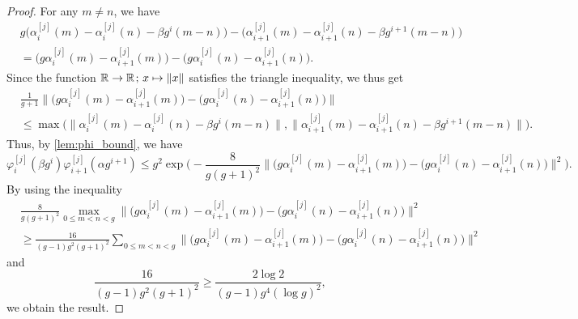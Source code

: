 \documentclass[hidelinks]{amsart}
\numberwithin{equation}{section}
\theoremstyle{plain}
\theoremstyle{definition}
\let\tmp\phi
\let\phi\varphi
\let\varphi\tmp
\let\tmp\epsilon
\let\epsilon\varepsilon
\let\varepsilon\tmp
\newcommand{\semicolon}{\nobreak\mskip2mu\mathpunct{}\nonscript
\mkern-\thinmuskip{;}\mskip6muplus1mu\relax}
\begin{document}
\begin{proof}
For any $m\neq n$, we have
\begin{align}
&g\bigl(\alpha_{i}^{[j]}(m)-\alpha_{i}^{[j]}(n)-\beta g^{i}(m-n)\bigr)
-
\bigl(\alpha_{i+1}^{[j]}(m)-\alpha_{i+1}^{[j]}(n)-\beta g^{i+1}(m-n)\bigr)\\
&=
\bigl(g\alpha_{i}^{[j]}(m)-\alpha_{i+1}^{[j]}(m)\bigr)
-
\bigl(g\alpha_{i}^{[j]}(n)-\alpha_{i+1}^{[j]}(n)\bigr).
\end{align}
Since the function $\mathbb{R}\to\mathbb{R}\semicolon x\mapsto\|x\|$ satisfies the triangle inequality, we thus get
\begin{align}
&\frac{1}{g+1}
\bigl\|\bigl(g\alpha_{i}^{[j]}(m)-\alpha_{i+1}^{[j]}(m)\bigr)
-
\bigl(g\alpha_{i}^{[j]}(n)-\alpha_{i+1}^{[j]}(n)\bigr)\bigr\|\\
&\le
\max\bigl(\|\alpha_{i}^{[j]}(m)-\alpha_{i}^{[j]}(n)-\beta g^{i}(m-n)\|,
\|\alpha_{i+1}^{[j]}(m)-\alpha_{i+1}^{[j]}(n)-\beta g^{i+1}(m-n)\|\bigr).
\end{align}
Thus, by \cref{lem:phi_bound}, we have
\[
\phi_{i}^{[j]}(\beta g^{i})
\phi_{i+1}^{[j]}(\alpha g^{i+1})
\le
g^{2}
\exp\biggl(
-
\frac{8}{g(g+1)^{2}}
\bigl\|\bigl(g\alpha_{i}^{[j]}(m)-\alpha_{i+1}^{[j]}(m)\bigr)
-
\bigl(g\alpha_{i}^{[j]}(n)-\alpha_{i+1}^{[j]}(n)\bigr)\bigr\|^{2}
\biggr).
\]
By using the inequality
\begin{align}
&\frac{8}{g(g+1)^{2}}
\max_{0\le m<n<g}
\bigl\|\bigl(g\alpha_{i}^{[j]}(m)-\alpha_{i+1}^{[j]}(m)\bigr)
-
\bigl(g\alpha_{i}^{[j]}(n)-\alpha_{i+1}^{[j]}(n)\bigr)\bigr\|^{2}\\
&\ge
\frac{16}{(g-1)g^{2}(g+1)^{2}}
\sum_{0\le m<n<g}
\bigl\|\bigl(g\alpha_{i}^{[j]}(m)-\alpha_{i+1}^{[j]}(m)\bigr)
-
\bigl(g\alpha_{i}^{[j]}(n)-\alpha_{i+1}^{[j]}(n)\bigr)\bigr\|^{2}
\end{align}
and
\[
\frac{16}{(g-1)g^{2}(g+1)^{2}}
\ge
\frac{2\log 2}{(g-1)g^{4}(\log g)^{2}},
\]
we obtain the result.
\end{proof}
\end{document}

